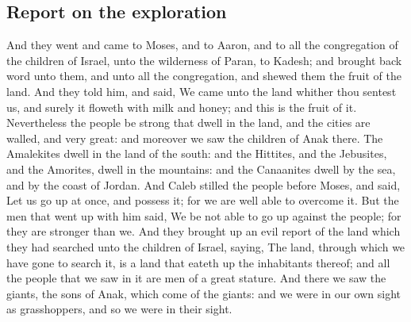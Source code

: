 \begin{biblechapter}
\section*{Report on the exploration}
\verse And they went and came to Moses, and to Aaron, and to all the congregation of the children of Israel, unto the wilderness of Paran, to Kadesh; and brought back word unto them, and unto all the congregation, and shewed them the fruit of the land.
\verse And they told him, and said, We came unto the land whither thou sentest us, and surely it floweth with milk and honey; and this is the fruit of it.
\verse Nevertheless the people be strong that dwell in the land, and the cities are walled, and very great: and moreover we saw the children of Anak there.
\verse The Amalekites dwell in the land of the south: and the Hittites, and the Jebusites, and the Amorites, dwell in the mountains: and the Canaanites dwell by the sea, and by the coast of Jordan.
\verse And Caleb stilled the people before Moses, and said, Let us go up at once, and possess it; for we are well able to overcome it.
\verse But the men that went up with him said, We be not able to go up against the people; for they are stronger than we.
\verse And they brought up an evil report of the land which they had searched unto the children of Israel, saying, The land, through which we have gone to search it, is a land that eateth up the inhabitants thereof; and all the people that we saw in it are men of a great stature.
\verse And there we saw the giants, the sons of Anak, which come of the giants: and we were in our own sight as grasshoppers, and so we were in their sight.
\end{biblechapter}

